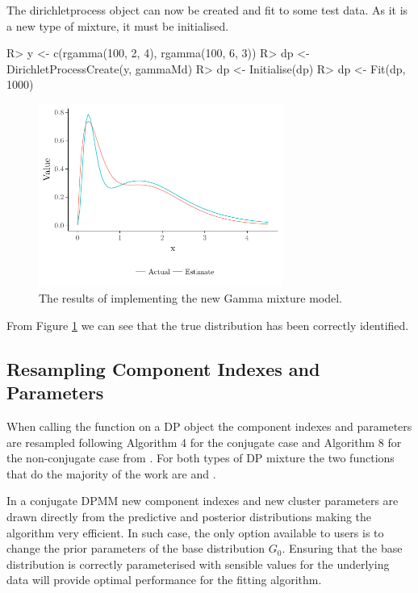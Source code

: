 \documentclass[nojss]{jss}
\begin{document}
The dirichletprocess object can now be created and fit to some test data. As it is a new type of mixture, it must be initialised.
\begin{Schunk}
\begin{Sinput}
R> y <- c(rgamma(100, 2, 4), rgamma(100, 6, 3))
R> dp <- DirichletProcessCreate(y, gammaMd)
R> dp <- Initialise(dp)
R> dp <- Fit(dp, 1000)
\end{Sinput}
\end{Schunk}
\begin{figure}[tb]
\centering
	\includegraphics[height=60mm, width=80mm]{img/gamma_mixture_plot.pdf}
\caption{The results of implementing the new Gamma mixture model.}
\label{fig:gammamixture}
\end{figure}
From Figure \ref{fig:gammamixture} we can see that the true distribution has been correctly identified.

\subsection{Resampling Component Indexes and Parameters}
When calling the  function on a DP object the component indexes and parameters are resampled following Algorithm 4 for the conjugate case and Algorithm 8 for the non-conjugate case from \cite{neal_markov_2000}. For both types of DP mixture the two functions that do the majority of the work are  and .

In a conjugate DPMM new component indexes and new cluster parameters are drawn directly from the predictive and posterior distributions making the algorithm very efficient. In such case, the only option available to users is to change the prior parameters of the base distribution $G_0$. Ensuring that the base distribution is correctly parameterised with sensible values for the underlying data will provide optimal performance for the fitting algorithm.
\end{document}

